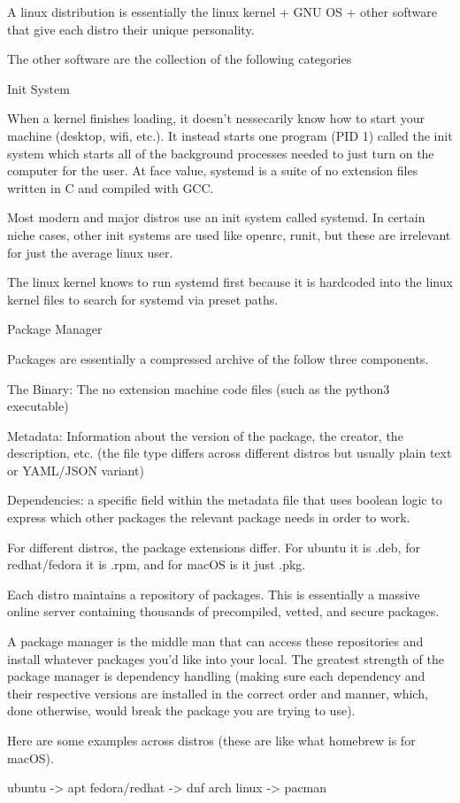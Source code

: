 \documentclass[10pt]{article}
\begin{document}
    A linux distribution is essentially the linux kernel + GNU OS + other software that give each distro their unique personality.

    The other software are the collection of the following categories

    \begin{core}[label=core:init_sys]{Init System}

      When a kernel finishes loading, it doesn't nessecarily know how to start your machine (desktop, wifi, etc.). It instead starts one program (PID 1) called the init system which starts all of the background processes needed to just turn on the computer for the user. At face value, systemd is a suite of no extension files written in C and compiled with GCC.

      Most modern and major distros use an init system called systemd. In certain niche cases, other init systems are used like openrc, runit, but these are irrelevant for just the average linux user.

      The linux kernel knows to run systemd first because it is hardcoded into the linux kernel files to search for systemd via preset paths.

    \end{core}

    \begin{core}[label=core:pack_man]{Package Manager}

      Packages are essentially a compressed archive of the follow three components.

        The Binary: The no extension machine code files (such as the python3 executable) 

        Metadata: Information about the version of the package, the creator, the description, etc. (the file type differs across different distros but usually plain text or YAML/JSON variant)

        Dependencies: a specific field within the metadata file that uses boolean logic to express which other packages the relevant package needs in order to work.

      For different distros, the package extensions differ. For ubuntu it is .deb, for redhat/fedora it is .rpm, and for macOS is it just .pkg.

      Each distro maintains a repository of packages. This is essentially a massive online server containing thousands of precompiled, vetted, and secure packages.

      A package manager is the middle man that can access these repositories and install whatever packages you'd like into your local. The greatest strength of the package manager is dependency handling (making sure each dependency and their respective versions are installed in the correct order and manner, which, done otherwise, would break the package you are trying to use).

      Here are some examples across distros (these are like what homebrew is for macOS).

        ubuntu -> apt
        fedora/redhat -> dnf 
        arch linux -> pacman

    \end{core}
\end{document}
